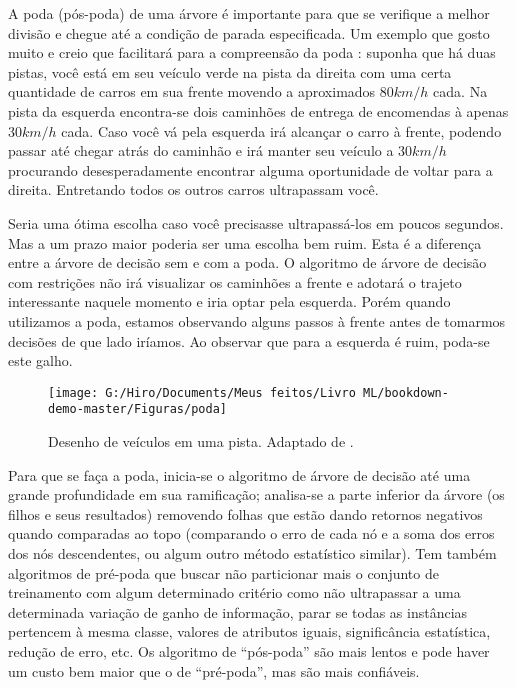 \documentclass[
  openany]{book}
\begin{document}
A poda (pós-poda) de uma árvore é importante para que se verifique a melhor divisão e chegue até a condição de parada especificada. Um exemplo que gosto muito e creio que facilitará para a compreensão da poda \citep{analytics} : suponha que há duas pistas, você está em seu veículo verde na pista da direita com uma certa quantidade de carros em sua frente movendo a aproximados 80\(km/h\) cada. Na pista da esquerda encontra-se dois caminhões de entrega de encomendas à apenas 30\(km/h\) cada. Caso você vá pela esquerda irá alcançar o carro à frente, podendo passar até chegar atrás do caminhão e irá manter seu veículo a 30\(km/h\) procurando desesperadamente encontrar alguma oportunidade de voltar para a direita. Entretando todos os outros carros ultrapassam você.

Seria uma ótima escolha caso você precisasse ultrapassá-los em poucos segundos. Mas a um prazo maior poderia ser uma escolha bem ruim. Esta é a diferença entre a árvore de decisão sem e com a poda. O algoritmo de árvore de decisão com restrições não irá visualizar os caminhões a frente e adotará o trajeto interessante naquele momento e iria optar pela esquerda. Porém quando utilizamos a poda, estamos observando alguns passos à frente antes de tomarmos decisões de que lado iríamos. Ao observar que para a esquerda é ruim, poda-se este galho.

\begin{figure}

{\centering \texttt{[image: G:/Hiro/Documents/Meus feitos/Livro ML/bookdown-demo-master/Figuras/poda]} 

}

\caption{Desenho de veículos em uma pista. Adaptado de \citep{analytics}.}\label{fig:poda}
\end{figure}



Para que se faça a poda, inicia-se o algoritmo de árvore de decisão até uma grande profundidade em sua ramificação; analisa-se a parte inferior da árvore (os filhos e seus resultados) removendo folhas que estão dando retornos negativos quando comparadas ao topo (comparando o erro de cada nó e a soma dos erros dos nós descendentes, ou algum outro método estatístico similar). Tem também algoritmos de pré-poda que buscar não particionar mais o conjunto de treinamento com algum determinado critério como não ultrapassar a uma determinada variação de ganho de informação, parar se todas as instâncias pertencem à mesma classe, valores de atributos iguais, significância estatística, redução de erro, etc. Os algoritmo de ``pós-poda'' são mais lentos e pode haver um custo bem maior que o de ``pré-poda'', mas são mais confiáveis.
\end{document}
